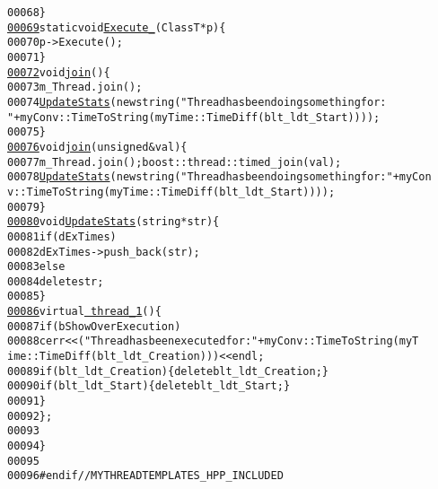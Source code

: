 \begin{footnotesize}
\begin{alltt}
00068         \}
\hypertarget{myThreadTemplates_8hpp_source_l00069}{}\hyperlink{classmyThreadTemplates_1_1thread__1_a24e615ac4afa0d376faefd500ed47e43}{00069}         \textcolor{keyword}{static} \textcolor{keywordtype}{void} \hyperlink{classmyThreadTemplates_1_1thread__1_a24e615ac4afa0d376faefd500ed47e43}{Execute_}(ClassT *p)\{
00070             p->Execute();
00071         \}
\hypertarget{myThreadTemplates_8hpp_source_l00072}{}\hyperlink{classmyThreadTemplates_1_1thread__1_ae393ee33ecbfee158a03a4c0f21cf95c}{00072}                 \textcolor{keywordtype}{void} \hyperlink{classmyThreadTemplates_1_1thread__1_ae393ee33ecbfee158a03a4c0f21cf95c}{join}()\{
00073             m\_Thread.join();
00074                     \hyperlink{classmyThreadTemplates_1_1thread__1_a2cd2286a9d51537395123832a6a25ebc}{UpdateStats}(\textcolor{keyword}{new} \textcolor{keywordtype}{string}(\textcolor{stringliteral}{"Thread has been doing something for: 
      "}+ myConv::TimeToString(myTime::TimeDiff(blt\_ldt\_Start))));
00075         \}
\hypertarget{myThreadTemplates_8hpp_source_l00076}{}\hyperlink{classmyThreadTemplates_1_1thread__1_a7acc2e784a8efe4b74a4bdded5feebb3}{00076}                 \textcolor{keywordtype}{void} \hyperlink{classmyThreadTemplates_1_1thread__1_a7acc2e784a8efe4b74a4bdded5feebb3}{join}(\textcolor{keywordtype}{unsigned} &val)\{
00077             m\_Thread.join(); boost::thread::timed\_join(val);
00078             \hyperlink{classmyThreadTemplates_1_1thread__1_a2cd2286a9d51537395123832a6a25ebc}{UpdateStats}(\textcolor{keyword}{new} \textcolor{keywordtype}{string}(\textcolor{stringliteral}{"Thread has been doing something for: "}+ myCon
      v::TimeToString(myTime::TimeDiff(blt\_ldt\_Start))));
00079         \}
\hypertarget{myThreadTemplates_8hpp_source_l00080}{}\hyperlink{classmyThreadTemplates_1_1thread__1_a2cd2286a9d51537395123832a6a25ebc}{00080}         \textcolor{keywordtype}{void} \hyperlink{classmyThreadTemplates_1_1thread__1_a2cd2286a9d51537395123832a6a25ebc}{UpdateStats}(\textcolor{keywordtype}{string} *str)\{
00081             \textcolor{keywordflow}{if} (dExTimes)
00082                 dExTimes->push\_back(str);
00083             \textcolor{keywordflow}{else}
00084                 \textcolor{keyword}{delete} str;
00085         \}
\hypertarget{myThreadTemplates_8hpp_source_l00086}{}\hyperlink{classmyThreadTemplates_1_1thread__1_aab0cedc80707090ec300be40e68c19c1}{00086}         \textcolor{keyword}{virtual} \hyperlink{classmyThreadTemplates_1_1thread__1_aab0cedc80707090ec300be40e68c19c1}{~thread_1}()\{
00087                     \textcolor{keywordflow}{if} (bShowOverExecution)
00088                 cerr<<(\textcolor{stringliteral}{"Thread has been executed for: "}+ myConv::TimeToString(myT
      ime::TimeDiff(blt\_ldt\_Creation)))<<endl;
00089             \textcolor{keywordflow}{if} ( blt\_ldt\_Creation ) \{ \textcolor{keyword}{delete} blt\_ldt\_Creation; \}
00090             \textcolor{keywordflow}{if} ( blt\_ldt\_Start ) \{ \textcolor{keyword}{delete} blt\_ldt\_Start; \}
00091         \}
00092 \};
00093 
00094 \}
00095 
00096 \textcolor{preprocessor}{#endif // MYTHREADTEMPLATES\_HPP\_INCLUDED}
\end{alltt}\end{footnotesize}
